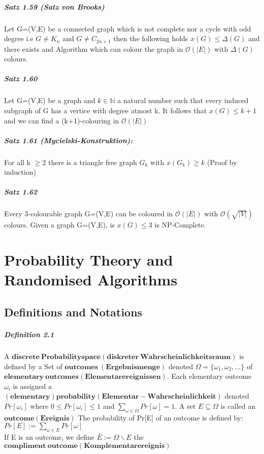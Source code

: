 \documentclass[8pt]{extreport}
\begin{document}
\paragraph{Satz 1.59 (Satz von Brooks)} Let G=(V,E) be a connected graph which is not complete nor a cycle with odd degree i.e $G\neq K_{n}$ and $G\neq C_{2n+1}$ then the following holds $\mathit{x}(G) \leq \Delta(G)$ and there exists and Algorithm which can colour the graph in $\mathcal{O}(|E|)$ with $\Delta (G)$ colours.
\paragraph{Satz 1.60} Let G=(V,E) be a graph and $k\in \mathbb{N}$ a natural number such that every induced subgraph of G has a vertice with degree atmost k. It follows that $\mathit{x}(G)\leq k+1$ and we can find a (k+1)-colouring in $\mathcal{O}(|E|)$
\paragraph{Satz 1.61 (Mycielski-Konstruktion):} For all k $\geq$2 there is a triangle free graph $G_{k}$ with $x(G_{k}) \geq k$ (Proof by induction)
\paragraph{Satz 1.62} Every 3-colourable graph G=(V,E) can be coloured in $\mathcal{O}(|E|)$ with $\mathcal{O}(\sqrt{|V|})$
colours. Given a graph G=(V,E), is $\mathit{x}(G) \leq 3$ is NP-Complete.
\chapter{Probability Theory and Randomised Algorithms}
\section{Definitions and Notations}
\paragraph{Definition 2.1} A $\mathbf{discrete \ Probabilityspace (diskreter \ Wahrscheinlichkeitsraum)}$ is defined by a Set of $\mathbf{outcomes\ (Ergebnismenge)}$ denoted $\Omega=\{\omega_{1},\omega_{2},\dots \}$ of $\mathbf{elementary\ outcomes (Elementarereignissen)}$. Each elementary outcome $\omega_{i}$ is assigned a $\mathbf{(elementary) probability (Elementar- Wahrscheinlichkeit)}$ denoted $Pr[\omega_{i}]$ where $0\leq Pr[\omega_{i}] \leq 1$ and $\sum_{\omega \in \Omega}Pr[\omega] = 1 $. A set $E\subseteq \Omega$ is called an $\mathbf{outcome (Ereignis)}$ The probability of Pr[E] of an outcome is defined by: $Pr[E] := \sum_{\omega \in E} Pr[\omega]$\\ If E is an outcome, we define $\bar{E}:= \Omega \backslash E$  the  $\mathbf{compliment\ outcome (Komplementarereignis)}$ 
\end{document}
